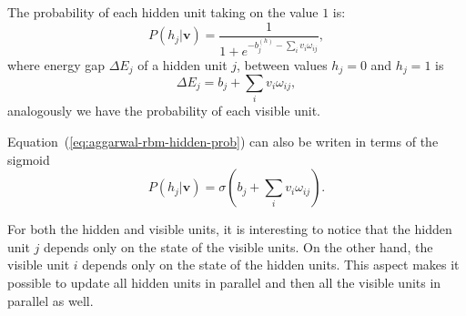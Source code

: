 The probability of each hidden unit taking on the value $1$ is:
\begin{equation}
    \label{eq:aggarwal-rbm-hidden-prob}
    P(h_{j} | \mathbf{v}) = \frac{1}{1 + e^{-b^{(h)}_{j} - \sum_{i} v_{i} \omega_{ij}}},
\end{equation}
where energy gap $\Delta E_{j}$ of a hidden unit $j$, between values $h_{j} = 0$ and $h_{j} = 1$ is
\begin{equation}
    \label{eq:aggarwal-rbm-energy-gap-hidden}
    \Delta E_{j} = b_{j} + \sum_{i} v_{i} \omega_{ij},
\end{equation}
analogously we have the probability of each visible unit.

Equation~(\ref{eq:aggarwal-rbm-hidden-prob}) can also be writen in terms of the sigmoid
\begin{equation}
    \label{eq:aggarwal-rbm-hidden-prob-sigmoid}
    P(h_{j} | \mathbf{v}) = \sigma \left( b_{j} + \sum_{i} v_{i} \omega_{ij} \right).
\end{equation}

For both the hidden and visible units, it is interesting to notice that the hidden unit $j$ depends only on the state of the visible units.
On the other hand, the visible unit $i$ depends only on the state of the hidden units.
This aspect makes it possible to update all hidden units in parallel and then all the visible units in parallel as well.

